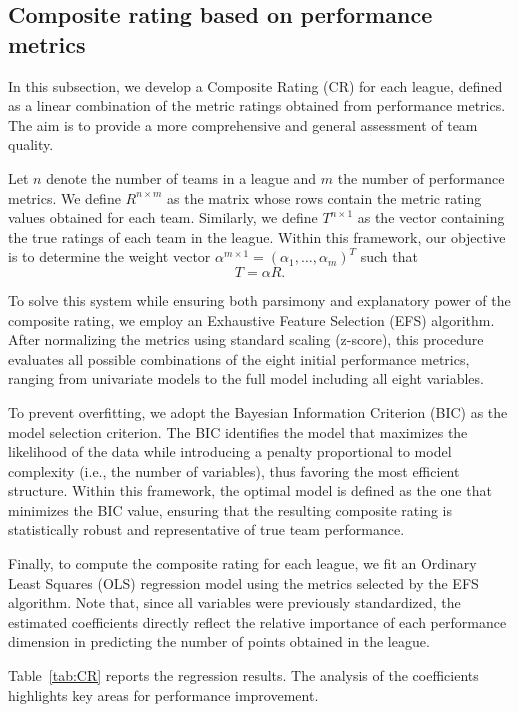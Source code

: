\documentclass[preprint, amsmath,amssymb, pre]{revtex4-2}
\begin{document}
\subsection{Composite rating based on performance metrics}
\label{sse:comp}

In this subsection, we develop a Composite Rating (CR) for each league, defined as a linear combination of the metric ratings obtained from performance metrics. The aim is to provide a more comprehensive and general assessment of team quality.

Let $n$ denote the number of teams in a league and $m$ the number of performance metrics. We define $R^{n \times m}$ as the matrix whose rows contain the metric rating values obtained for each team. Similarly, we define $T^{n \times 1}$ as the vector containing the true ratings of each team in the league. Within this framework, our objective is to determine the weight vector $\alpha^{m \times 1} = (\alpha_1, \ldots, \alpha_m)^T$ such that
$$
T = \alpha R .
$$

To solve this system while ensuring both parsimony and explanatory power of the composite rating, we employ an Exhaustive Feature Selection (EFS) algorithm. After normalizing the metrics using standard scaling (z-score), this procedure evaluates all possible combinations of the eight initial performance metrics, ranging from univariate models to the full model including all eight variables.

To prevent overfitting, we adopt the Bayesian Information Criterion (BIC) as the model selection criterion. The BIC identifies the model that maximizes the likelihood of the data while introducing a penalty proportional to model complexity (i.e., the number of variables), thus favoring the most efficient structure. Within this framework, the optimal model is defined as the one that minimizes the BIC value, ensuring that the resulting composite rating is statistically robust and representative of true team performance.

Finally, to compute the composite rating for each league, we fit an Ordinary Least Squares (OLS) regression model using the metrics selected by the EFS algorithm. Note that, since all variables were previously standardized, the estimated coefficients directly reflect the relative importance of each performance dimension in predicting the number of points obtained in the league.

Table~\ref{tab:CR} reports the regression results. The analysis of the coefficients highlights key areas for performance improvement.
\end{document}
